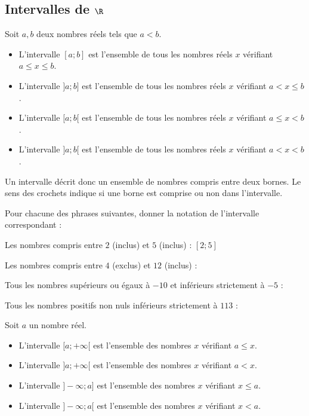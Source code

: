 \documentclass{article}
\begin{document}
\newpage

\subsection{Intervalles de $\R$}
\begin{tcolorbox}
\begin{definition}
Soit $a,b$ deux nombres réels tels que $a < b$.
\begin{itemize}
\item L'intervalle $[a;b]$ est l'ensemble de tous les nombres réels $x$ vérifiant $a \leq x \leq b$. 
\item L'intervalle $]a;b]$ est l'ensemble de tous les nombres réels $x$ vérifiant $a < x \leq b$. 
\item L'intervalle $[a;b[$ est l'ensemble de tous les nombres réels $x$ vérifiant $a \leq x < b$. 
\item L'intervalle $]a;b[$ est l'ensemble de tous les nombres réels $x$ vérifiant $a < x < b$. 
\end{itemize}
\end{definition}
\end{tcolorbox}
\begin{remark}
Un intervalle décrit donc un ensemble de nombres compris entre deux bornes. Le sens des crochets indique si une borne est comprise ou non dans l'intervalle.
\end{remark}
\begin{example}
Pour chacune des phrases suivantes, donner la notation de l'intervalle correspondant :
\begin{enumquestions}
\item Les nombres compris entre $2$ (inclus) et $5$ (inclus) : $[2;5]$
\item Les nombres compris entre $4$ (exclus) et $12$ (inclus) : \answersline
\item Tous les nombres supérieurs ou égaux à $-10$ et inférieurs strictement à $-5$ : \answersline
\item Tous les nombres positifs non nuls inférieurs strictement à $113$ : \answersline
\end{enumquestions}
\end{example}
\begin{tcolorbox}
\begin{definition}
Soit $a$ un nombre réel.
\begin{itemize}
\item L'intervalle $[a;+\infty[$ est l'ensemble des nombres $x$ vérifiant $a \leq x$.
\item L'intervalle $]a;+\infty[$ est l'ensemble des nombres $x$ vérifiant $a < x$.
\item L'intervalle $]-\infty; a]$ est l'ensemble des nombres $x$ vérifiant $x \leq a$.
\item L'intervalle $]-\infty; a[$ est l'ensemble des nombres $x$ vérifiant $x < a$.
\end{itemize}
\end{definition}
\end{tcolorbox}
\end{document}
